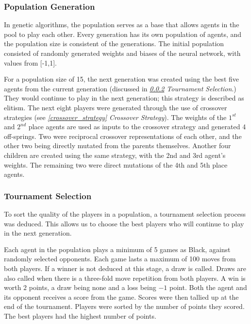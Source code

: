 \documentclass[12pt,a4paper]{article}
\begin{document}
        \subsubsection{Population Generation} \label{population_generation}
            In genetic algorithms, the population serves as a base that allows agents in the pool to play each other. Every generation has its own population of agents, and the population size is consistent of the generations. The initial population consisted of randomly generated weights and biases of the neural network, with values from [-1,1]. 
            
            For a population size of 15, the next generation was created using the best five agents from the current generation (discussed in {\it{\ref{tournament_selection} Tournament Selection}}.) They would continue to play in the next generation; this strategy is described as elitism. The next eight players were generated through the use of crossover strategies (see {\it{\ref{crossover_strategy} Crossover Strategy}}). The weights of the $1^{st}$ and $2^{nd}$ place agents are used as inputs to the crossover strategy and generated 4 off-springs. Two were reciprocal crossover representations of each other, and the other two being directly mutated from the parents themselves. Another four children are created using the same strategy, with the 2nd and 3rd agent's weights. The remaining two were direct mutations of the 4th and 5th place agents.

        \subsubsection{Tournament Selection} \label{tournament_selection}

            To sort the quality of the players in a population, a tournament selection process was deduced. This allows us to choose the best players who will continue to play in the next generation.

            Each agent in the population plays a minimum of 5 games as Black, against randomly selected opponents. Each game lasts a maximum of 100 moves from both players. If a winner is not deduced at this stage, a draw is called. Draws are also called when there is a three-fold move repetition from both players. A win is worth $2$ points, a draw being none and a loss being $-1$ point. Both the agent and its opponent receives a score from the game.
            Scores were then tallied up at the end of the tournament. Players were sorted by the number of points they scored. The best players had the highest number of points.
  
\end{document}
